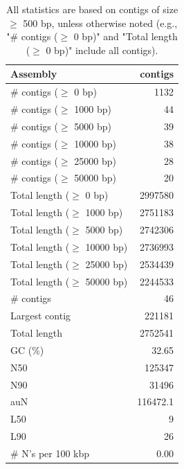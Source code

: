 \documentclass[12pt,a4paper]{article}
\begin{document}
\begin{table}[ht]
\begin{center}
\caption{All statistics are based on contigs of size $\geq$ 500 bp, unless otherwise noted (e.g., "\# contigs ($\geq$ 0 bp)" and "Total length ($\geq$ 0 bp)" include all contigs).}
\begin{tabular}{|l*{1}{|r}|}
\hline
Assembly & contigs \\ \hline
\# contigs ($\geq$ 0 bp) & 1132 \\ \hline
\# contigs ($\geq$ 1000 bp) & 44 \\ \hline
\# contigs ($\geq$ 5000 bp) & 39 \\ \hline
\# contigs ($\geq$ 10000 bp) & 38 \\ \hline
\# contigs ($\geq$ 25000 bp) & 28 \\ \hline
\# contigs ($\geq$ 50000 bp) & 20 \\ \hline
Total length ($\geq$ 0 bp) & 2997580 \\ \hline
Total length ($\geq$ 1000 bp) & 2751183 \\ \hline
Total length ($\geq$ 5000 bp) & 2742306 \\ \hline
Total length ($\geq$ 10000 bp) & 2736993 \\ \hline
Total length ($\geq$ 25000 bp) & 2534439 \\ \hline
Total length ($\geq$ 50000 bp) & 2244533 \\ \hline
\# contigs & 46 \\ \hline
Largest contig & 221181 \\ \hline
Total length & 2752541 \\ \hline
GC (\%) & 32.65 \\ \hline
N50 & 125347 \\ \hline
N90 & 31496 \\ \hline
auN & 116472.1 \\ \hline
L50 & 9 \\ \hline
L90 & 26 \\ \hline
\# N's per 100 kbp & 0.00 \\ \hline
\end{tabular}
\end{center}
\end{table}
\end{document}
